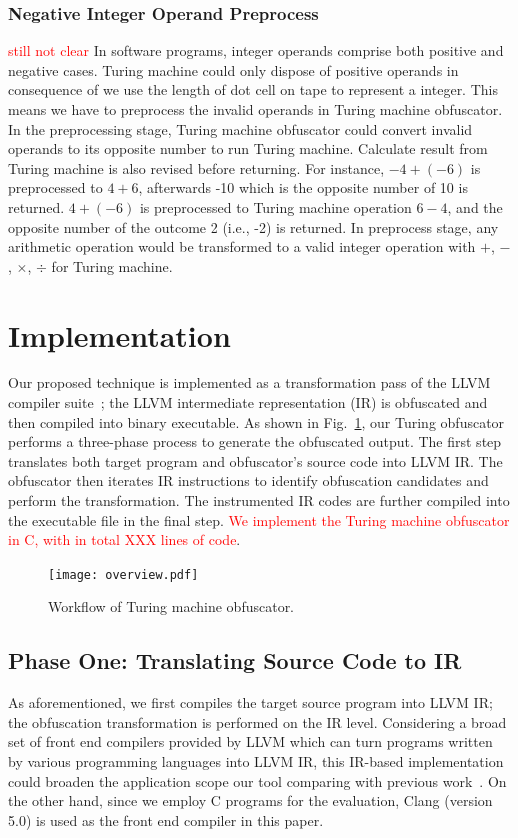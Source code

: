 \documentclass[lnicst]{svmultln}
\newcommand{\F}{Fig.}
\begin{document}
\subsubsection{Negative Integer Operand Preprocess}
\textcolor{red}{still not clear}
In software programs, integer operands comprise both positive and negative
cases. Turing machine could only dispose of positive operands in consequence of
we use the length of dot cell on tape to represent a integer. This means we have
to preprocess the invalid operands in Turing machine obfuscator. In the
preprocessing stage, Turing machine obfuscator could convert invalid operands to
its opposite number to run Turing machine. Calculate result from Turing machine
is also revised before returning. For instance, $-4 + (-6)$ is preprocessed to
$4 + 6$, afterwards -10 which is the opposite number of 10 is returned. $4 +
(-6)$ is preprocessed to Turing machine operation $6 - 4$, and the opposite
number of the outcome 2 (i.e., -2) is returned. In preprocess stage, any
arithmetic operation would be transformed to a valid integer operation with $+$,
$-$, $\times$, $\div$ for Turing machine.

\section{Implementation}
Our proposed technique is implemented as a transformation pass of the LLVM
compiler suite~\cite{LLVM}; the LLVM intermediate representation (IR) is
obfuscated and then compiled into binary executable. As shown in
\F~\ref{fig:five}, our Turing obfuscator performs a three-phase process to
generate the obfuscated output. The first step translates both target program
and obfuscator's source code into LLVM IR. The obfuscator then iterates IR
instructions to identify obfuscation candidates and perform the transformation.
The instrumented IR codes are further compiled into the executable file in the
final step. \textcolor{red}{We implement the Turing machine obfuscator in C,
  with in total XXX lines of code}.

\begin{figure}
 \texttt{[image: overview.pdf]}
 \caption{Workflow of Turing machine obfuscator.}
 \label{fig:five}
\end{figure}

\subsection{Phase One: Translating Source Code to IR}
\label{subsec:phase-one}
As aforementioned, we first compiles the target source program into LLVM IR; the
obfuscation transformation is performed on the IR level. Considering a broad set
of front end compilers provided by LLVM which can turn programs written by
various programming languages into LLVM IR, this IR-based implementation could
broaden the application scope our tool comparing with previous
work~\cite{Ma, Zhi, Maieee}. On the other hand, since we employ C programs for
the evaluation, Clang (version 5.0) is used as the front end compiler in this
paper.
\end{document}
